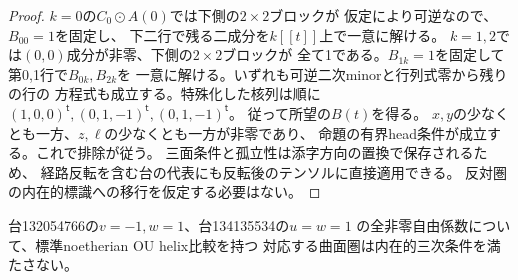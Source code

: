 \begin{proof}
$k=0$の$C_0\odot A(0)$では下側の$2\times2$ブロックが
仮定により可逆なので、$B_{00}=1$を固定し、
下二行で残る二成分を$k[[t]]$上で一意に解ける。
$k=1,2$では$(0,0)$成分が非零、下側の$2\times2$ブロックが
全て1である。$B_{1k}=1$を固定して第0,1行で$B_{0k},B_{2k}$を
一意に解ける。いずれも可逆二次minorと行列式零から残りの行の
方程式も成立する。特殊化した核列は順に
$(1,0,0)^{\mathsf t},(0,1,-1)^{\mathsf t},(0,1,-1)^{\mathsf t}$。
従って所望の$B(t)$を得る。
$x,y$の少なくとも一方、$z,\ell$の少なくとも一方が非零であり、
命題の有界head条件が成立する。これで排除が従う。
三面条件と孤立性は添字方向の置換で保存されるため、
経路反転を含む台の代表にも反転後のテンソルに直接適用できる。
反対圏の内在的標識への移行を仮定する必要はない。
\end{proof}

\begin{theorem}[五零の最後の二族の補集合による排除]
\label{thm:ou-five-zero-complement-exclusion}
台132054766の$v=-1,w=1$、台134135534の$u=w=1$
の全非零自由係数について、標準noetherian OU helix比較を持つ
対応する曲面圏は内在的三次条件を満たさない。
\end{theorem}
